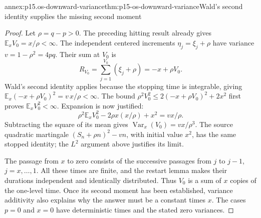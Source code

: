 \begin{annexitem}{annex:p15.os-downward-variance}{thm:p15-os-downward-variance}{Wald's second identity supplies the missing second moment}
\begin{proof}
Let \(\rho=q-p>0\). The preceding hitting result already gives
\(\mathbb E_xV_0=x/\rho<\infty\).
The independent centered increments
\(\eta_j=\xi_j+\rho\) have variance
\(v=1-\rho^2=4pq\). Their sum at \(V_0\) is
\[
 R_{V_0}=\sum_{j=1}^{V_0}(\xi_j+\rho)
                  =-x+\rho V_0.
 \]
Wald's second identity applies because the stopping time is
integrable, giving
\(\mathbb E_x(-x+\rho V_0)^2=v\,x/\rho<\infty\).
The bound
\(\rho^2V_0^2\leq2(-x+\rho V_0)^2+2x^2\)
first proves \(\mathbb E_xV_0^2<\infty\).
Expansion is now justified:
\[
 \rho^2\mathbb E_xV_0^2-2\rho x(x/\rho)+x^2
                                      =v x/\rho.
 \]
Subtracting the square of its mean gives
\(\operatorname{Var}_x(V_0)=vx/\rho^3\).
The source quadratic martingale
\((S_n+\rho n)^2-vn\), with initial value \(x^2\),
has the same stopped identity; the \(L^2\) argument above
justifies its limit.

The passage from \(x\) to zero consists of the successive
passages from \(j\) to \(j-1\), \(j=x,\ldots,1\).
All these times are finite, and the restart lemma makes their
durations independent and identically distributed.
Thus \(V_0\) is a sum of \(x\) copies of the one-level time.
Once its second moment has been established, variance additivity
also explains why the answer must be a constant times \(x\).
The cases \(p=0\) and \(x=0\) have deterministic times and
the stated zero variances.
\end{proof}
\end{annexitem}

